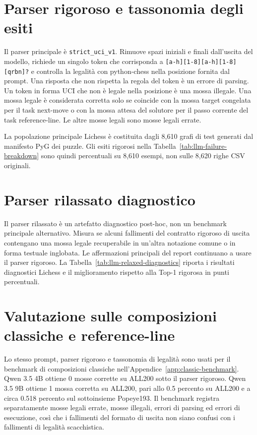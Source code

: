 \section{Parser rigoroso e tassonomia degli esiti}
\label{app:llm-protocol:strict}

Il parser principale è \texttt{strict\_uci\_v1}.  Rimuove spazi iniziali e finali dall'uscita del modello, richiede un singolo token che corrisponda a \nolinkurl{[a-h][1-8][a-h][1-8][qrbn]?} e controlla la legalità con python-chess nella posizione fornita dal prompt.  Una risposta che non rispetta la regola del token è un errore di parsing.  Un token in forma UCI che non è legale nella posizione è una mossa illegale.  Una mossa legale è considerata corretta solo se coincide con la mossa target congelata per il task next-move o con la mossa attesa del solutore per il passo corrente del task reference-line.  Le altre mosse legali sono mosse legali errate.

La popolazione principale Lichess è costituita dagli 8,610 grafi di test generati dal manifesto PyG dei puzzle.  Gli esiti rigorosi nella Tabella~\ref{tab:llm-failure-breakdown} sono quindi percentuali su 8,610 esempi, non sulle 8,620 righe CSV originali.



\section{Parser rilassato diagnostico}
\label{app:llm-protocol:relaxed}

Il parser rilassato è un artefatto diagnostico post-hoc, non un benchmark principale alternativo.  Misura se alcuni fallimenti del contratto rigoroso di uscita contengano una mossa legale recuperabile in un'altra notazione comune o in forma testuale inglobata.  Le affermazioni principali del report continuano a usare il parser rigoroso.  La Tabella~\ref{tab:llm-relaxed-diagnostics} riporta i risultati diagnostici Lichess e il miglioramento rispetto alla Top-1 rigorosa in punti percentuali.



\section{Valutazione sulle composizioni classiche e reference-line}
\label{app:llm-protocol:classic}

Lo stesso prompt, parser rigoroso e tassonomia di legalità sono usati per il benchmark di composizioni classiche nell'Appendice~\ref{app:classic-benchmark}.  Qwen 3.5 4B ottiene 0 mosse corrette su ALL200 sotto il parser rigoroso.  Qwen 3.5 9B ottiene 1 mossa corretta su ALL200, pari allo 0.5 percento su ALL200 e a circa 0.518 percento sul sottoinsieme Popeye193.  Il benchmark registra separatamente mosse legali errate, mosse illegali, errori di parsing ed errori di esecuzione, così che i fallimenti del formato di uscita non siano confusi con i fallimenti di legalità scacchistica.

